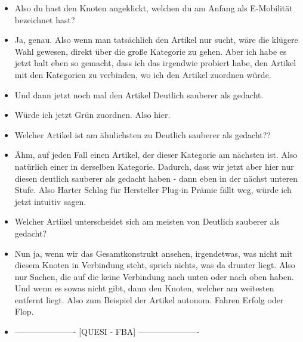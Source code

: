 {\begin{itemize}[]
                  Aber ich glaube, das wird wahrscheinlich hierunter gelistet sein.
                  Hoffe ich jetzt zumindest.
                  Nö, eben nicht.
                  Unlucky.
                  Also ich wollte es jetzt so spezifisch wie möglich machen.
                  Ich könnte natürlich auch hier lang, also den Knoten anklicken und dann schauen, wo der Artikel ist.
            \item {} Also du hast den Knoten angeklickt, welchen du am Anfang als E-Mobilität bezeichnet hast?
            \item {} Ja, genau.
                  Also wenn man tatsächlich den Artikel nur sucht, wäre die klügere Wahl gewesen, direkt über die große Kategorie zu gehen.
                  Aber ich habe es jetzt halt eben so gemacht, dass ich das irgendwie probiert habe, den Artikel mit den Kategorien zu verbinden, wo ich den Artikel zuordnen würde.
            \item {} Und dann jetzt noch mal den Artikel \flqq Deutlich sauberer als gedacht\frqq{}.
            \item {} Würde ich jetzt Grün zuordnen. Also hier.
            \item {} Welcher Artikel ist am ähnlichsten zu \flqq Deutlich sauberer als gedacht?\frqq{}?
            \item {} Ähm, auf jeden Fall einen Artikel, der dieser Kategorie am nächsten ist.
                  Also natürlich einer in derselben Kategorie.
                  Dadurch, dass wir jetzt aber hier nur diesen deutlich sauberer als gedacht haben - dann eben in der nächst unteren Stufe.
                  Also \flqq Harter Schlag für Hersteller Plug-in Prämie fällt weg\frqq{}, würde ich jetzt intuitiv sagen.
            \item {} Welcher Artikel unterscheidet sich am meisten von \flqq Deutlich sauberer als gedacht\frqq{}?
            \item {} Nun ja, wenn wir das Gesamtkonstrukt ansehen, irgendetwas, was nicht mit diesem Knoten in Verbindung steht, sprich nichts, was da drunter liegt.
                  Also nur Sachen, die auf die keine Verbindung nach unten oder nach oben haben.
                  Und wenn es sowas nicht gibt, dann den Knoten, welcher am weitesten entfernt liegt.
                  Also zum Beispiel der Artikel \flqq autonom. Fahren Erfolg oder Flop\frqq{}.
            \item {----------------------} [QUESI - FBA] {----------------------}

\end{itemize}}
